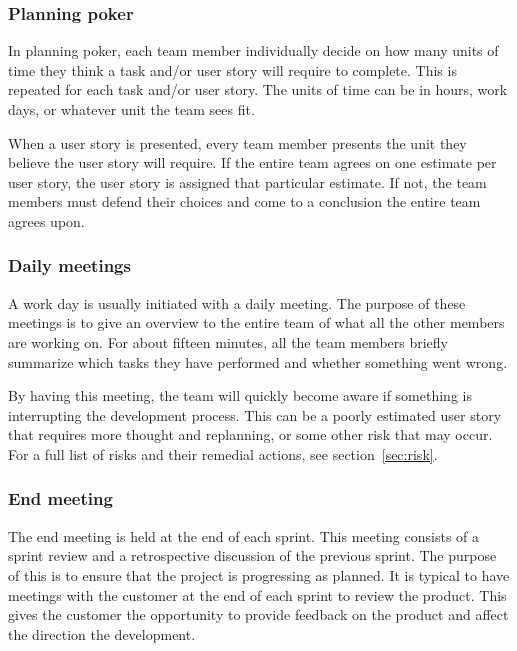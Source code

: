 \subsubsection{Planning poker}
In planning poker, each team member individually decide on how many units of time they think a task and/or user story will require to complete. This is repeated for each task and/or user story. The units of time can be in hours, work days, or whatever unit the team sees fit.

When a user story is presented, every team member presents the unit they believe the user story will require. If the entire team agrees on one estimate per user story, the user story is assigned that particular estimate. If not, the team members must defend their choices and come to a conclusion the entire team agrees upon.

\subsubsection{Daily meetings}
A work day is usually initiated with a daily meeting. The purpose of these meetings is to give an overview to the entire team of what all the other members are working on. For about fifteen minutes, all the team members briefly summarize which tasks they have performed and whether something went wrong.

By having this meeting, the team will quickly become aware if something is interrupting the development process. This can be a poorly estimated user story that requires more thought and replanning, or some other risk that may occur. For a full list of risks and their remedial actions, see section~\ref{sec:risk}. 

\subsubsection{End meeting}
The end meeting is held at the end of each sprint. This meeting consists of a sprint review and a retrospective discussion of the previous sprint. The purpose of this is to ensure that the project is progressing as planned. It is typical to have meetings with the customer at the end of each sprint to review the product. This gives the customer the opportunity to provide feedback on the product and affect the direction the development.


